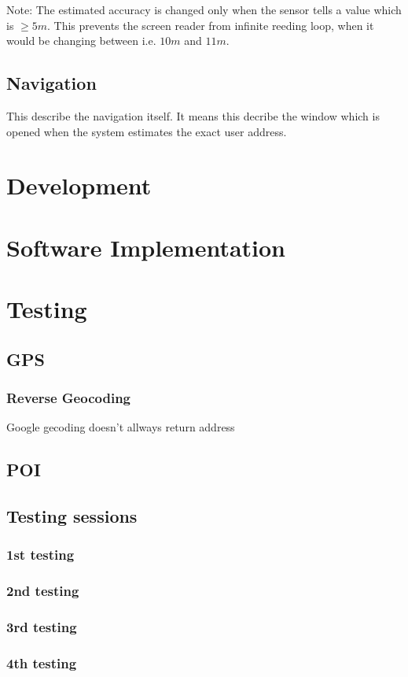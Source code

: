 \documentclass[11pt,oneside,a4paper]{book}
\begin{document}
			Note: The estimated accuracy is changed only when the sensor tells a value which is $\geq 5m$. This prevents the screen reader from infinite reeding loop, when it would be changing between i.e. $10m$ and $11m$. 
		\section{Navigation}
		\label{sec:navifation}
		This describe the navigation itself. It means this decribe the window which is opened when the system estimates the exact user address.
	\chapter{Development}
	\chapter{Software Implementation}
	\chapter{Testing}
		\section{GPS}
			\subsection{Reverse Geocoding}
			Google gecoding doesn't allways return address
		\section{POI}
				
		
		\section{Testing sessions}
			\subsection{1st testing}
				\label{sec:1th-testing}
			\subsection{2nd testing}
				\label{sec:2th-testing}
			\subsection{3rd testing}
				\label{sec:3th-testing}
			\subsection{4th testing}
				\label{sec:4th-testing}
\end{document}
